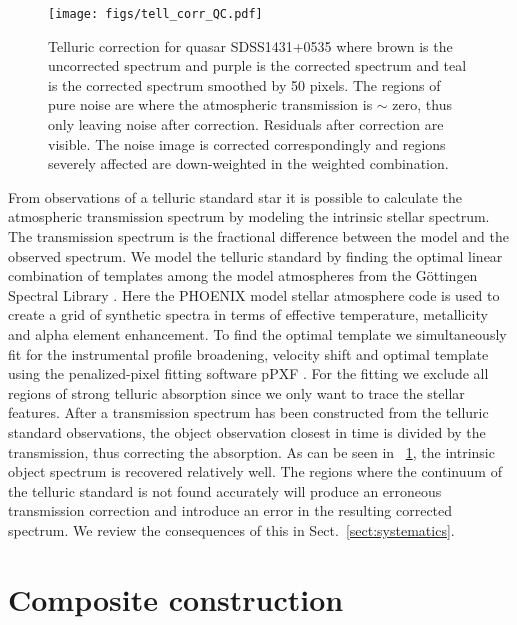 \documentclass{aa}    %
\newcommand{\figref}[1]{\ref{fig:#1}}
\newcommand{\Fig}[1]{\figurename~\figref{#1}}
\newcommand{\fig}[1]{\Fig{#1}}
\newcommand{\figlabel}[1]{\label{fig:#1}}
\newcommand{\sectionname}{Sect.}
\newcommand{\Sect}[1]{\sectionname~\ref{sect:#1}}
\newcommand{\sect}[1]{\Sect{#1}}
\newcommand{\sectlabel}[1]{\label{sect:#1}}
\begin{document}
\begin{figure}[t!]
  \centering
  \texttt{[image: figs/tell\_corr\_QC.pdf]}
  \caption[]{Telluric correction for quasar SDSS1431+0535 where brown is the
uncorrected spectrum and purple is the corrected spectrum and teal is the corrected
spectrum smoothed by 50 pixels. The regions of pure noise are where the atmospheric
transmission is $\sim$ zero, thus only leaving noise after correction. Residuals
after correction are visible. The noise image is corrected correspondingly and
regions severely affected are down-weighted in the weighted combination.}
\figlabel{telluric_qc}
\end{figure}


From observations of a telluric standard star it is possible to calculate
the atmospheric transmission spectrum by modeling the intrinsic stellar
spectrum. The transmission spectrum is the fractional difference between the
model and the observed spectrum. We model the telluric standard by finding the
optimal linear combination of templates among the model atmospheres from the
G\"ottingen Spectral Library \citep{Husser2013}. Here the PHOENIX model stellar
atmosphere code is used to create a grid of synthetic spectra in terms of
effective temperature, metallicity and alpha element enhancement. To find the
optimal template we simultaneously fit for the instrumental profile broadening,
velocity shift and optimal template using the penalized-pixel fitting software
pPXF \citep{Cappellari2004}. For the fitting we exclude all regions of strong
telluric absorption since we only want to trace the stellar features. After a
transmission spectrum has been constructed from the telluric standard
observations, the object observation closest in time is divided by the
transmission, thus correcting the absorption. As can be seen in
\fig{telluric_qc}, the intrinsic object spectrum is recovered relatively well.
The regions where the continuum of the telluric standard is not found accurately
will produce an erroneous transmission correction and introduce an error in the
resulting corrected spectrum. We review the consequences of this in
\sect{systematics}. 


\section{Composite construction}   \sectlabel{construct}
\end{document}
